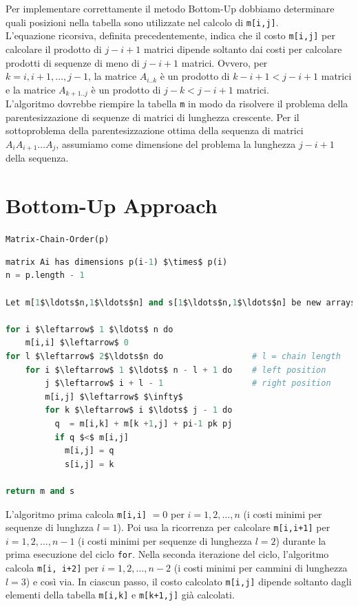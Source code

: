 Per implementare correttamente il metodo Bottom-Up dobbiamo determinare
quali posizioni nella tabella sono utilizzate nel calcolo di
\texttt{m[i,j]}.\\ L'equazione ricorsiva, definita precedentemente,
indica che il costo \texttt{m[i,j]} per calcolare il prodotto di
$j-i+1$ matrici dipende soltanto dai costi per calcolare prodotti di
sequenze di meno di $j-i+1$ matrici. Ovvero, per $k=i,i+1,\ldots,j-1$,
la matrice $A_{i..k}$ è un prodotto di $k-i+1 < j-i+1$ matrici e la
matrice $A_{k+1..j}$ è un prodotto di $j-k < j-i+1$ matrici.\\

L'algoritmo dovrebbe riempire la tabella \texttt{m} in modo da risolvere
il problema della parentesizzazione di sequenze di matrici di lunghezza
crescente. Per il sottoproblema della parentesizzazione ottima della
sequenza di matrici $A_i A_{i+1} \ldots A_j$, assumiamo come dimensione
del problema la lunghezza $j-i+1$ della sequenza.


\section{Bottom-Up Approach}

\texttt{Matrix-Chain-Order(p)}
\begin{lstlisting}[language=Python, mathescape=true]
matrix Ai has dimensions p(i-1) $\times$ p(i)
n = p.length - 1

Let m[1$\ldots$n,1$\ldots$n] and s[1$\ldots$n,1$\ldots$n] be new arrays

for i $\leftarrow$ 1 $\ldots$ n do
	m[i,i] $\leftarrow$ 0
for l $\leftarrow$ 2$\ldots$n do                  # l = chain length
	for i $\leftarrow$ 1 $\ldots$ n - l + 1 do    # left position 
		j $\leftarrow$ i + l - 1                  # right position
		m[i,j] $\leftarrow$ $\infty$
		for k $\leftarrow$ i $\ldots$ j - 1 do
          q  = m[i,k] + m[k +1,j] + pi-1 pk pj
          if q $<$ m[i,j]
            m[i,j] = q
            s[i,j] = k

return m and s
\end{lstlisting}

L'algoritmo prima calcola \texttt{m[i,i]} $= 0$ per
$i=1, 2,\ldots,n$ (i costi minimi per sequenze di lunghzza $l=1$). Poi
usa la ricorrenza per calcolare \texttt{m{[}i,i+1{]}} per
$i=1,2,\ldots,n-1$ (i costi minimi per sequenze di lunghezza $l=2$)
durante la prima esecuzione del ciclo \texttt{for}. Nella seconda
iterazione del ciclo, l'algoritmo calcola \texttt{m{[}i,\ i+2{]}} per
$i =1,2,\ldots,n-2$ (i costi minimi per cammini di lunghezza $l=3$) e
così via. In ciascun passo, il costo calcolato \texttt{m{[}i,j{]}}
dipende soltanto dagli elementi della tabella \texttt{m{[}i,k{]}} e
\texttt{m{[}k+1,j{]}} già calcolati.


